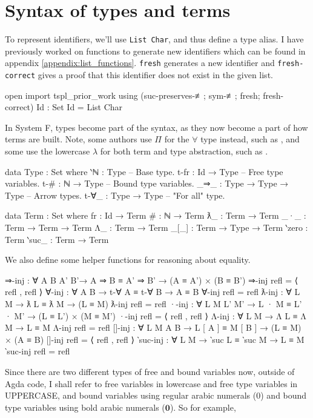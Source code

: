 \documentclass[logo,bsc,singlespacing,parskip,online]{infthesis}
\begin{document}
\section{Syntax of types and terms}
To represent identifiers, we'll use \texttt{List Char}, and thus define a type alias. I have
previously worked on functions to generate new identifiers which can be found in appendix
\ref{appendix:list_functions}. \texttt{fresh} generates a new identifier and \texttt{fresh-correct}
gives a proof that this identifier does not exist in the given list.
\begin{code}
  open import tspl_prior_work
    using (suc-preserves-≢; sym-≢; fresh; fresh-correct)
  Id : Set
  Id = List Char
\end{code}

In System F, types become part of the syntax, as they now become a part of how terms are built.
Note, some authors use $\Pi$ for the $\forall$ type instead, such as \citet{hutton_system_2019}, and
some use the lowercase $\lambda$ for both term and type abstraction, such as
\citet{pierce_types_2002}.
\begin{code}
  data Type : Set where
    ‵ℕ      : Type                 -- Base type.
    t-fr     : Id → Type           -- Free type variables.
    t-#      : ℕ → Type            -- Bound type variables.
    _⇒_      : Type → Type → Type  -- Arrow types.
    t-∀_     : Type → Type         -- "For all" type.

  data Term : Set where
    fr     : Id → Term
    #      : ℕ → Term
    ƛ_     : Term → Term
    _·_    : Term → Term → Term
    Λ_     : Term → Term
    _[_]   : Term → Type → Term
    ‵zero  : Term
    ‵suc_  : Term → Term
\end{code}

We also define some helper functions for reasoning about equality.
\begin{code}
  ⇒-inj : ∀ {A B A' B'}→ A ⇒ B ≡ A' ⇒ B' → (A ≡ A') × (B ≡ B')
  ⇒-inj refl = ⟨ refl , refl ⟩
  ∀-inj : ∀ {A B} → t-∀ A ≡ t-∀ B → A ≡ B
  ∀-inj refl = refl
  ƛ-inj : ∀ {L M} → ƛ L ≡ ƛ M → (L ≡ M)
  ƛ-inj refl = refl
  ·-inj : ∀ {L M L' M'} → L · M ≡ L' · M' → (L ≡ L') × (M ≡ M')
  ·-inj refl = ⟨ refl , refl ⟩
  Λ-inj : ∀ {L M} → Λ L ≡ Λ M → L ≡ M
  Λ-inj refl = refl
  []-inj : ∀ {L M A B} → L [ A ] ≡ M [ B ] → (L ≡ M) × (A ≡ B)
  []-inj refl = ⟨ refl , refl ⟩
  ‵suc-inj : ∀ {L M} → ‵suc L ≡ ‵suc M → L ≡ M
  ‵suc-inj refl = refl
\end{code}

Since there are two different types of free and bound variables now, outside of Agda code, I shall
refer to free variables in lowercase and free type variables in UPPERCASE, and bound variables using
regular arabic numerals ($0$) and bound type variables using bold arabic numerals ($\mathbf{0}$). So
for example,
\end{document}
